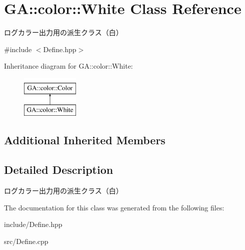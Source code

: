 \hypertarget{class_g_a_1_1color_1_1_white}{}\section{GA\+::color\+::White Class Reference}
\label{class_g_a_1_1color_1_1_white}


ログカラー出力用の派生クラス（白）  




{\ttfamily \#include $<$Define.\+hpp$>$}

Inheritance diagram for GA\+::color\+::White\+:\begin{figure}[H]
\begin{center}
\leavevmode
\includegraphics[height=2.000000cm]{class_g_a_1_1color_1_1_white}
\end{center}
\end{figure}
\subsection*{Additional Inherited Members}


\subsection{Detailed Description}
ログカラー出力用の派生クラス（白） 



The documentation for this class was generated from the following files\+:\begin{DoxyCompactItemize}
\item 
include/Define.\+hpp\item 
src/Define.\+cpp\end{DoxyCompactItemize}
